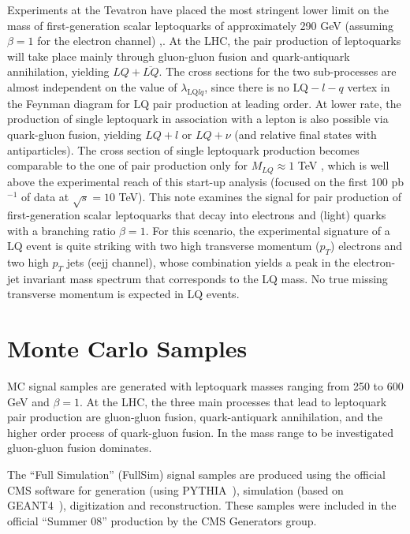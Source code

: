 \documentclass{cmspaper}
\begin{document}
\begin{linenumbers}
Experiments at the Tevatron have placed the most stringent lower limit on the mass of first-generation scalar 
leptoquarks of approximately 290 GeV (assuming $\beta=1$ for the electron channel) \cite{d02008},\cite{cdf2005}.
At the LHC, the pair production of leptoquarks will take place mainly through gluon-gluon fusion and 
quark-antiquark annihilation, yielding $LQ + \overline{LQ}$. 
The cross sections for the two sub-processes are almost independent on the value of 
$\lambda_{\mbox{LQ}lq}$, since there is no $\mbox{LQ}-l-q$ vertex in the Feynman diagram for LQ pair production 
at leading order. At lower rate, the production of single leptoquark in association with a lepton is also possible via quark-gluon 
fusion, yielding $LQ+ l$ or $LQ+ \nu$ (and relative final states with antiparticles). The cross section of single leptoquark production
becomes comparable to the one of pair production only for $M_{LQ}\approx 1$ TeV \cite{LQSingleAndPairProd}, 
which is well above the experimental reach of this start-up analysis (focused on the first 100 pb$^{-1}$ of data at $\sqrt{s}=10$ TeV).  
This note examines the signal for pair production of first-generation scalar leptoquarks that decay into electrons and 
(light) quarks with a branching ratio $\beta=1$. 
For this scenario, the experimental signature of a LQ event is quite striking with two 
high transverse momentum ($p_T$) electrons and two high $p_T$ jets (eejj channel), 
whose combination yields a peak in the electron-jet invariant mass 
spectrum that corresponds to the LQ mass. No true missing transverse momentum is expected in LQ events.


\section{Monte Carlo Samples} \label{sec:MCSamples}
MC signal samples are generated with leptoquark masses ranging from 250 to 600 GeV and $\beta=1$. 
At the LHC, the three main processes that lead to leptoquark pair production are gluon-gluon fusion, 
quark-antiquark annihilation, and the higher order process of quark-gluon fusion. In the mass range to be investigated gluon-gluon fusion dominates. 

The ``Full Simulation'' (FullSim) signal samples are produced using 
the official CMS software for generation (using PYTHIA~\cite{PYTHIA}), 
simulation (based on GEANT4~\cite{GEANT4}), digitization and reconstruction. 
These samples were included in the official ``Summer 08'' production by the CMS Generators group.


\end{linenumbers}
\end{document}
